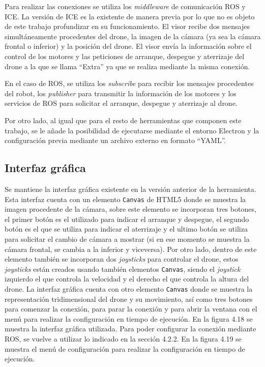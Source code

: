 Para realizar las conexiones se utiliza los \textit{middleware} de comunicación ROS y ICE. La versión de ICE es la existente de manera previa por lo que no es objeto de este trabajo profundizar en su funcionamiento. El visor recibe dos mensajes simultáneamente procedentes del drone, la imagen de la cámara (ya sea la cámara frontal o inferior) y la posición del drone. El visor envía la información sobre el control de los motores y las peticiones de arranque, despegue y aterrizaje del drone a la que se llama ``Extra'' ya que se realiza mediante la misma conexión.

En el caso de ROS, se utiliza los \textit{subscribe} para recibir los mensajes procedentes del robot, los \textit{publisher} para transmitir la información de los motores y los servicios de ROS para solicitar el arranque, despegue y aterrizaje al drone.

Por otro lado, al igual que para el resto de herramientas que componen este trabajo, se le añade la posibilidad de ejecutarse mediante el entorno Electron y la configuración previa mediante un archivo externo en formato ``YAML''.

\subsection{Interfaz gráfica}
Se mantiene la interfaz gráfica existente en la versión anterior de la herramienta. Esta interfaz cuenta con un elemento \texttt{Canvas} de HTML5 donde se muestra la imagen procedente de la cámara, sobre este elemento se incorporan tres botones, el primer botón es el utilizado para indicar el arranque y despegue, el segundo botón es el que se utiliza para indicar el aterrizaje y el ultimo botón se utiliza para solicitar el cambio de cámara a mostrar (si en ese momento se muestra la cámara frontal, se cambia a la inferior y viceversa). Por otro lado, dentro de este elemento también se incorporan dos \textit{joysticks} para controlar el drone, estos \textit{joysticks} están creados usando también elementos \texttt{Canvas}, siendo el \textit{joystick} izquierdo el que controla la velocidad y el derecho el que controla la altura del drone. La interfaz gráfica cuenta con otro elemento \texttt{Canvas} donde se muestra la representación tridimensional del drone y su movimiento, así como tres botones para comenzar la conexión, para parar la conexión y para abrir la ventana con el menú para realizar la configuración en tiempo de ejecución. En la figura 4.18 se muestra la interfaz gráfica utilizada. Para poder configurar la conexión mediante ROS, se vuelve a utilizar lo indicado en la sección 4.2.2. En la figura 4.19 se muestra el menú de configuración para realizar la configuración en tiempo de ejecución.

